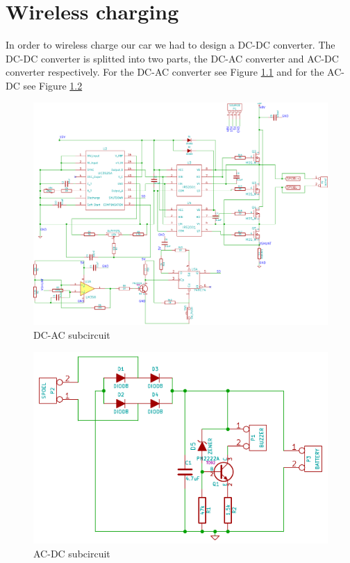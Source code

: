 \documentclass[final]{scrreprt} %
\begin{document}
\chapter{Wireless charging}
In order to wireless charge our car we had to design a DC-DC converter. The DC-DC converter is splitted into two parts, the DC-AC converter and AC-DC converter respectively. 
For the DC-AC converter see Figure \ref{fig:DC-AC} and for the AC-DC see Figure \ref{fig:AC-DC}

\begin{figure}[h]
	\includegraphics[width=\linewidth]{resources/DC-AC-rc.pdf}
	\caption{DC-AC subcircuit}
	\label{fig:DC-AC}
\end{figure}

\begin{figure}[h]
	\includegraphics[width=\linewidth]{resources/AC-DC-rc.pdf}
	\caption{AC-DC subcircuit}
	\label{fig:AC-DC}
\end{figure}
\end{document}
